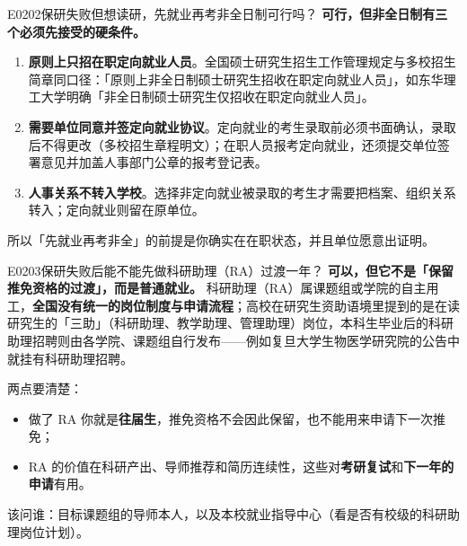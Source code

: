\begin{qa}{E0202}{保研失败但想读研，先就业再考非全日制可行吗？}
\textbf{可行，但非全日制有三个必须先接受的硬条件。}
\begin{enumerate}
  \item \textbf{原则上只招在职定向就业人员}。全国硕士研究生招生工作管理规定与多校招生简章同口径：「原则上非全日制硕士研究生招收在职定向就业人员」，如东华理工大学明确「非全日制硕士研究生仅招收在职定向就业人员」。
  \item \textbf{需要单位同意并签定向就业协议}。定向就业的考生录取前必须书面确认，录取后不得更改（多校招生章程明文）；在职人员报考定向就业，还须提交单位签署意见并加盖人事部门公章的报考登记表。
  \item \textbf{人事关系不转入学校}。选择非定向就业被录取的考生才需要把档案、组织关系转入；定向就业则留在原单位。
\end{enumerate}

所以「先就业再考非全」的前提是你确实在在职状态，并且单位愿意出证明。
\end{qa}

\begin{qa}{E0203}{保研失败后能不能先做科研助理（RA）过渡一年？}
\textbf{可以，但它不是「保留推免资格的过渡」，而是普通就业。}
科研助理（RA）属课题组或学院的自主用工，\textbf{全国没有统一的岗位制度与申请流程}；高校在研究生资助语境里提到的是在读研究生的「三助」（科研助理、教学助理、管理助理）岗位，本科生毕业后的科研助理招聘则由各学院、课题组自行发布——例如复旦大学生物医学研究院的公告中就挂有科研助理招聘。

两点要清楚：
\begin{itemize}
  \item 做了 RA 你就是\textbf{往届生}，推免资格不会因此保留，也不能用来申请下一次推免；
  \item RA 的价值在科研产出、导师推荐和简历连续性，这些对\textbf{考研复试}和\textbf{下一年的申请}有用。
\end{itemize}

该问谁：目标课题组的导师本人，以及本校就业指导中心（看是否有校级的科研助理岗位计划）。
\end{qa}

